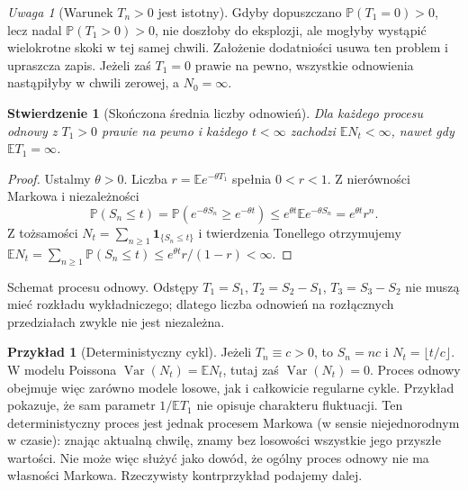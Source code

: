 \documentclass[11pt,a4paper,oneside]{report}
\numberwithin{equation}{chapter}
\theoremstyle{plain}
\newtheorem{stwierdzenie}[twierdzenie]{Stwierdzenie}
\theoremstyle{definition}
\newtheorem{przyklad}{Przykład}[chapter]
\theoremstyle{remark}
\newtheorem{uwaga}{Uwaga}[chapter]
\newcommand{\Prob}{\mathbb{P}}
\newcommand{\E}{\mathbb{E}}
\newcommand{\Var}{\operatorname{Var}}
\newcommand{\ind}[1]{\mathbf{1}_{#1}}
\begin{document}
\begin{uwaga}[Warunek $T_n>0$ jest istotny]
Gdyby dopuszczano $\Prob(T_1=0)>0$, lecz nadal
$\Prob(T_1>0)>0$, nie doszłoby do eksplozji, ale mogłyby
wystąpić wielokrotne skoki w tej samej chwili.
Założenie dodatniości usuwa ten problem i upraszcza zapis.
Jeżeli zaś $T_1=0$ prawie na pewno, wszystkie odnowienia
nastąpiłyby w chwili zerowej, a $N_0=\infty$.
\end{uwaga}

\begin{stwierdzenie}[Skończona średnia liczby odnowień]
Dla każdego procesu odnowy z $T_1>0$ prawie na pewno i każdego
$t<\infty$ zachodzi $\E N_t<\infty$, nawet gdy $\E T_1=\infty$.
\end{stwierdzenie}
\begin{proof}
Ustalmy $\theta>0$. Liczba
$r=\E e^{-\theta T_1}$ spełnia $0<r<1$.
Z nierówności Markowa i niezależności
\[
\Prob(S_n\le t)=\Prob(e^{-\theta S_n}\ge e^{-\theta t})
\le e^{\theta t}\E e^{-\theta S_n}=e^{\theta t}r^n.
\]
Z tożsamości $N_t=\sum_{n\ge1}\ind{\{S_n\le t\}}$
i twierdzenia Tonellego otrzymujemy
$\E N_t=\sum_{n\ge1}\Prob(S_n\le t)
\le e^{\theta t}r/(1-r)<\infty$.
\end{proof}

\begin{center}
\par\smallskip\small Schemat procesu odnowy. Odstępy
$T_1=S_1$, $T_2=S_2-S_1$, $T_3=S_3-S_2$ nie muszą mieć rozkładu
wykładniczego; dlatego liczba odnowień na rozłącznych przedziałach
zwykle nie jest niezależna.
\end{center}

\begin{przyklad}[Deterministyczny cykl]
Jeżeli $T_n\equiv c>0$, to $S_n=nc$ i
$N_t=\lfloor t/c\rfloor$. W modelu Poissona
$\Var(N_t)=\E N_t$, tutaj zaś $\Var(N_t)=0$.
Proces odnowy obejmuje więc zarówno modele losowe, jak i
całkowicie regularne cykle. Przykład pokazuje, że sam parametr
$1/\E T_1$ nie opisuje charakteru fluktuacji.
Ten deterministyczny proces jest jednak procesem Markowa
(w sensie niejednorodnym w czasie): znając aktualną chwilę,
znamy bez losowości wszystkie jego przyszłe wartości.
Nie może więc służyć jako dowód, że ogólny proces odnowy
nie ma własności Markowa. Rzeczywisty kontrprzykład podajemy dalej.
\end{przyklad}
\end{document}
